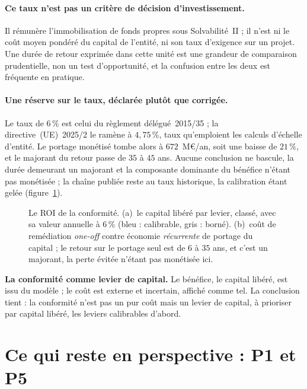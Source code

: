 \paragraph{Ce taux n'est pas un critère de décision d'investissement.} Il rémunère l'immobilisation
de fonds propres sous Solvabilité~II ; il n'est ni le coût moyen pondéré du capital de l'entité, ni
son taux d'exigence sur un projet. Une durée de retour exprimée dans cette unité est une grandeur
de comparaison prudentielle, non un test d'opportunité, et la confusion entre les deux est
fréquente en pratique.

\paragraph{Une réserve sur le taux, déclarée plutôt que corrigée.} Le taux de $6\,\%$ est celui du
règlement délégué~2015/35 ; la directive~(UE)~2025/2 le ramène à $4{,}75\,\%$, taux qu'emploient
les calculs d'échelle d'entité. Le portage monétisé tombe alors à $672$~M\euro/an, soit une baisse
de $21\,\%$, et le majorant du retour passe de $35$ à $45$ ans. Aucune conclusion ne bascule, la
durée demeurant un majorant et la composante dominante du bénéfice n'étant pas monétisée ; la
chaîne publiée reste au taux historique, la calibration étant gelée (figure~\ref{fig:roi}).

\begin{figure}[htbp]\centering
{}
\caption{Le ROI de la conformité. (a)~le capital libéré par levier, classé, avec sa valeur
annuelle à $6\,\%$ (bleu : calibrable, gris : borné). (b)~coût de remédiation \emph{one-off}
contre économie \emph{récurrente} de portage du capital ; le retour sur le portage seul est de
$6$ à $35$ ans, et c'est un majorant, la perte évitée n'étant pas monétisée ici.}
\label{fig:roi}
\end{figure}

\begin{cle}
\textbf{La conformité comme levier de capital.} Le bénéfice, le capital libéré, est issu du modèle ;
le coût est externe et incertain, affiché comme tel. La conclusion tient : la conformité n'est pas
un pur coût mais un levier de capital, à prioriser par capital libéré, les leviers calibrables
d'abord.
\end{cle}

\section{Ce qui reste en perspective : P1 et P5}
\label{sec:perspectives-pilier}

